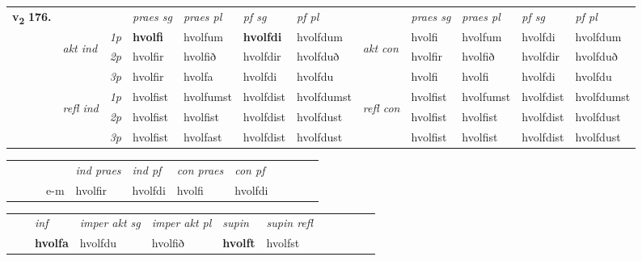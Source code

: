 \begin{tabular}{llllllllllll} \toprule
\multirow{4}{*}{{{\textbf{v{\textsubscript{2}}} \Large{\textbf{176.}}}}}  & &   &  \textit{praes sg}  & \textit{praes pl}  &\textit{ pf sg} & \textit{pf pl} &  &  \textit{praes sg}  & \textit{praes pl}  & \textit{pf sg} & \textit{pf pl } \\*
	\cmidrule{4-7} \cmidrule{9-12}
 & \multirow{3}{*}{\begin{turn}{90}\textit{akt ind}\end{turn}} & {\textit{1p}} & \textbf{hvolfi} & hvolfum    & \textbf{hvolfdi} & hvolfdum & \multirow{3}{*}{\begin{turn}{90}\textit{akt con}\end{turn}} &hvolfi & hvolfum & hvolfdi & hvolfdum\\*
& &  {\textit{2p}} &  hvolfir  & hvolfið   & hvolfdir & hvolfduð & & hvolfir & hvolfið & hvolfdir & hvolfduð \\*
& &  {\textit{3p}} & hvolfir & hvolfa   & hvolfdi & hvolfdu & & hvolfi & hvolfi& hvolfdi & hvolfdu  \\*
\cmidrule{4-7} \cmidrule{9-12}
 &\multirow{3}{*}{\begin{turn}{90}\textit{refl ind}\end{turn}} & {\textit{1p}} & hvolfist & hvolfumst    & hvolfdist & hvolfdumst & \multirow{3}{*}{\begin{turn}{90}\textit{refl con}\end{turn}}  &hvolfist & hvolfumst & hvolfdist & hvolfdumst\\*
 &&  {\textit{2p}} &  hvolfist  & hvolfist   & hvolfdist & hvolfdust & &hvolfist & hvolfist & hvolfdist & hvolfdust \\*
& &  {\textit{3p}} & hvolfist & hvolfast   & hvolfdist & hvolfdust & & hvolfist & hvolfist& hvolfdist & hvolfdust  \\*
\cmidrule{4-7} \cmidrule{9-12}
\end{tabular}


\begin{tabular}{llllllllllll}
 & &  & &  \textit{ind praes} & \textit{ind pf} & \textit{con praes} & \textit{con pf} \\*
&  & & e-m & hvolfir & hvolfdi & hvolfi & hvolfdi \\*
\cmidrule{5-9}
\end{tabular}


\begin{tabular}{llllllllllll}
 & & \textit{inf} & \textit{imper akt sg} & \textit{imper akt pl}    & \textit{supin} & \textit{supin refl}      \\*
  & & \textbf{hvolfa} & hvolfdu  & hvolfið    &  \textbf{hvolft} & hvolfst  \\*
\cmidrule{1-12}
\end{tabular}





